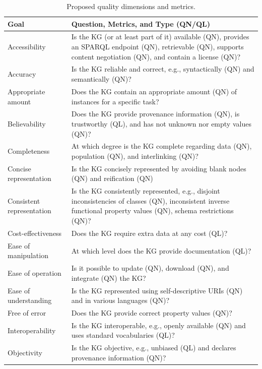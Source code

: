 \documentclass[runningheads]{llncs}
\begin{document}
\begin{table}
\caption{Proposed quality dimensions and metrics.}
\label{tab:quality-goals-questions-metrics}
\centering
\begin{threeparttable}
\begin{tabular}{|p{2.7cm}|p{9cm}|}
\hline
Goal & Question, Metrics, and Type (QN/QL) \\ 
\hline
Accessibility & 
Is the KG (or at least part of it) available (QN), provides an SPARQL endpoint (QN), retrievable (QN), supports content negotiation (QN), and contain a license (QN)? \\
\hline
Accuracy & Is the KG reliable and correct, e.g., syntactically (QN) and semantically (QN)? \\ 
\hline
Appropriate amount & Does the KG contain an appropriate amount (QN) of instances for a specific task? \\ 
\hline
Believability &  Does the KG provide provenance information (QN), is trustworthy (QL), and has not unknown nor empty values (QN)?  \\ 
\hline
Completeness & At which degree is the KG complete regarding data (QN), population (QN), and interlinking (QN)? \\ 
\hline
Concise representation & Is the KG concisely represented by avoiding blank nodes (QN) and reification (QN)\\ 
\hline
Consistent representation & Is the KG consistently represented, e.g., disjoint inconsistencies of classes (QN), inconsistent inverse functional property values (QN), schema restrictions (QN)?  \\ 
\hline
Cost-effectiveness &  Does the KG require extra data at any cost (QL)? \\ 
\hline
Ease of manipulation & At which level does the KG provide documentation (QL)?   \\ 
\hline
Ease of operation & Is it possible to update (QN), download (QN), and integrate (QN) the KG?  \\ 
\hline
Ease of understanding & Is the KG represented using self-descriptive URIs (QN) and in various languages (QN)? \\ 
\hline
Free of error & Does the KG provide correct property values (QN)?  \\ 
\hline
Interoperability &  Is the KG interoperable, e.g., openly available (QN) and uses standard vocabularies (QL)?  \\ 
\hline
Objectivity &  Is the KG objective, e.g., unbiased (QL) and declares provenance information (QN)? \\ 

\end{tabular}
\end{threeparttable}
\end{table}
\end{document}
